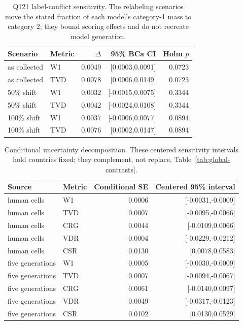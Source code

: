 \FloatBarrier
\begin{table}[!htbp]
\centering
\caption{Q121 label-conflict sensitivity. The relabeling scenarios move the stated fraction of each model's category-1 mass to category 2; they bound scoring effects and do not recreate model generation.}
\label{tab:q121-sensitivity}
\small
\begin{tabular}{llrrr}
\toprule
\rowcolor{tablehead} Scenario & Metric & $\Delta$ & 95\% BCa CI & Holm $p$ \\
\midrule
as collected & W1 & 0.0049 & [0.0003,0.0091] & 0.0723 \\
as collected & TVD & 0.0078 & [0.0006,0.0149] & 0.0723 \\
50\% shift & W1 & 0.0032 & [-0.0015,0.0075] & 0.3344 \\
50\% shift & TVD & 0.0042 & [-0.0024,0.0108] & 0.3344 \\
100\% shift & W1 & 0.0037 & [-0.0006,0.0077] & 0.0894 \\
100\% shift & TVD & 0.0076 & [0.0002,0.0147] & 0.0894 \\
\bottomrule
\end{tabular}
\end{table}
\begin{table}[!htbp]
\centering
\caption{Conditional uncertainty decomposition. These centered sensitivity intervals hold countries fixed; they complement, not replace, Table~\ref{tab:global-contrasts}.}
\label{tab:conditional-uncertainty}
\small
\begin{tabular}{llrr}
\toprule
\rowcolor{tablehead} Source & Metric & Conditional SE & Centered 95\% interval \\
\midrule
human cells & W1 & 0.0006 & [-0.0031,-0.0009] \\
human cells & TVD & 0.0007 & [-0.0095,-0.0066] \\
human cells & CRG & 0.0044 & [-0.0109,0.0066] \\
human cells & VDR & 0.0004 & [-0.0229,-0.0212] \\
human cells & CSR & 0.0130 & [0.0078,0.0583] \\
five generations & W1 & 0.0005 & [-0.0030,-0.0009] \\
five generations & TVD & 0.0007 & [-0.0094,-0.0067] \\
five generations & CRG & 0.0061 & [-0.0140,0.0097] \\
five generations & VDR & 0.0049 & [-0.0317,-0.0123] \\
five generations & CSR & 0.0102 & [0.0130,0.0529] \\
\bottomrule
\end{tabular}
\end{table}
